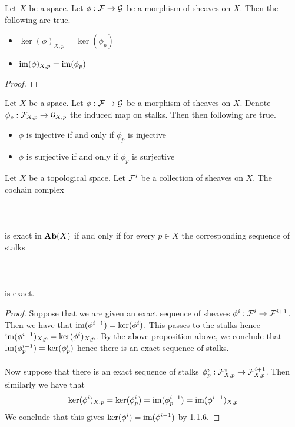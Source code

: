 \documentclass[a4paper]{article}
\begin{document}
\begin{prp}{}{} Let $X$ be a space. Let $\phi:\mathcal{F}\to\mathcal{G}$ be a morphism of sheaves on $X$. Then the following are true. 
\begin{itemize}
\item $\ker(\phi)_{X,p}=\ker(\phi_p)$
\item $\operatorname{im}(\phi)_{X,p}=\operatorname{im}(\phi_p)$
\end{itemize} \tcbline
\begin{proof}
\end{proof}
\end{prp}

\begin{prp}{}{} Let $X$ be a space. Let $\phi:\mathcal{F}\to\mathcal{G}$ be a morphism of sheaves on $X$. Denote $\phi_p:\mathcal{F}_{X,p}\to\mathcal{G}_{X,p}$ the induced map on stalks. Then then following are true. 
\begin{itemize}
\item $\phi$ is injective if and only if $\phi_p$ is injective
\item $\phi$ is surjective if and only if $\phi_p$ is surjective
\end{itemize}
\end{prp}

\begin{prp}{}{} Let $X$ be a topological space. Let $\mathcal{F}^i$ be a collection of sheaves on $X$. The cochain complex \\~\\
 \\~\\
is exact in $\bold{Ab}(X)$ if and only if for every $p\in X$ the corresponding sequence of stalks \\~\\
 \\~\\
is exact. \tcbline
\begin{proof}
Suppose that we are given an exact sequence of sheaves $\phi^i:\mathcal{F}^i\to\mathcal{F}^{i+1}$. Then we have that $\operatorname{im}(\phi^{i-1})=\ker(\phi^i)$. This passes to the stalks hence $\operatorname{im}(\phi^{i-1})_{X,p}=\ker(\phi^i)_{X,p}$. By the above proposition above, we conclude that $\operatorname{im}(\phi^{i-1}_p)=\ker(\phi^i_p)$ hence there is an exact sequence of stalks. \\~\\

Now suppose that there is an exact sequence of stalks $\phi_p^i:\mathcal{F}_{X,p}^i\to\mathcal{F}_{X,p}^{i+1}$. Then similarly we have that $$\ker(\phi^i)_{X,p}=\ker(\phi_p^i)=\operatorname{im}(\phi_p^{i-1})=\operatorname{im}(\phi^{i-1})_{X,p}$$ We conclude that this gives $\ker(\phi^i)=\operatorname{im}(\phi^{i-1})$ by 1.1.6. 
\end{proof}
\end{prp}
\end{document}
